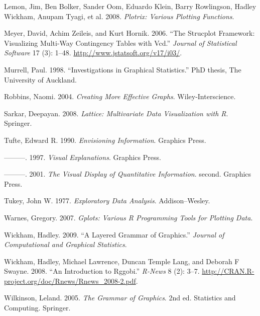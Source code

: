 Lemon, Jim, Ben Bolker, Sander Oom, Eduardo Klein, Barry Rowlingson,
Hadley Wickham, Anupam Tyagi, et al. 2008. \emph{Plotrix: Various
Plotting Functions}.

Meyer, David, Achim Zeileis, and Kurt Hornik. 2006. ``The Strucplot
Framework: Visualizing Multi-Way Contingency Tables with Vcd.''
\emph{Journal of Statistical Software} 17 (3): 1--48.
\url{http://www.jstatsoft.org/v17/i03/}.

Murrell, Paul. 1998. ``Investigations in Graphical Statistics.''
PhD thesis, The University of Auckland.

Robbins, Naomi. 2004. \emph{Creating More Effective Graphs}.
Wiley-Interscience.

Sarkar, Deepayan. 2008. \emph{Lattice: Multivariate Data Visualization
with R}. Springer.

Tufte, Edward R. 1990. \emph{Envisioning Information}. Graphics Press.

---------. 1997. \emph{Visual Explanations}. Graphics Press.

---------. 2001. \emph{The Visual Display of Quantitative Information}.
second. Graphics Press.

Tukey, John W. 1977. \emph{Exploratory Data Analysis}. Addison--Wesley.

Warnes, Gregory. 2007. \emph{Gplots: Various R Programming Tools for
Plotting Data}.

Wickham, Hadley. 2009. ``A Layered Grammar of Graphics.'' \emph{Journal
of Computational and Graphical Statistics}.

Wickham, Hadley, Michael Lawrence, Duncan Temple Lang, and Deborah F
Swayne. 2008. ``An Introduction to Rggobi.'' \emph{R-News} 8 (2): 3--7.
\url{http://CRAN.R-project.org/doc/Rnews/Rnews_2008-2.pdf}.

Wilkinson, Leland. 2005. \emph{The Grammar of Graphics}. 2nd ed.
Statistics and Computing. Springer.
